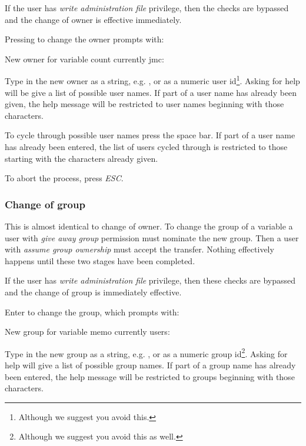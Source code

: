 If the user has \textit{write administration file} privilege, then the
checks are bypassed and the change of owner is effective immediately.

Pressing  to change the owner prompts with:

\begin{expara}

New owner for variable {\textquotesingle}count{\textquotesingle}
currently jmc:

\end{expara}

Type in the new owner as a string, e.g. , or
as a numeric user id\footnote{Although we suggest you avoid this.}.
Asking for help will be give a list of possible user names. If part of
a user name has already been given, the help message will be restricted
to user names beginning with those characters.

To cycle through possible user names press the space bar. If part of a
user name has already been entered, the list of users cycled through is
restricted to those starting with the characters already given.

To abort the process, press \textit{ESC}.

\subsubsection{Change of group}
This is almost identical to change of owner. To change the group of a
variable a user with \textit{give away group} permission must nominate
the new group. Then a user with \textit{assume group ownership} must
accept the transfer. Nothing effectively happens until these two stages
have been completed.

If the user has \textit{write administration file} privilege, then these
checks are bypassed and the change of group is immediately effective.

Enter  to change the group, which prompts with:

\begin{expara}

New group for variable {\textquotesingle}memo{\textquotesingle}
currently users:

\end{expara}

Type in the new group as a string, e.g. , or as
a numeric group id\footnote{Although we suggest you avoid this as
well.}. Asking for help will give a list of possible group names. If
part of a group name has already been entered, the help message will be
restricted to groups beginning with those characters.

